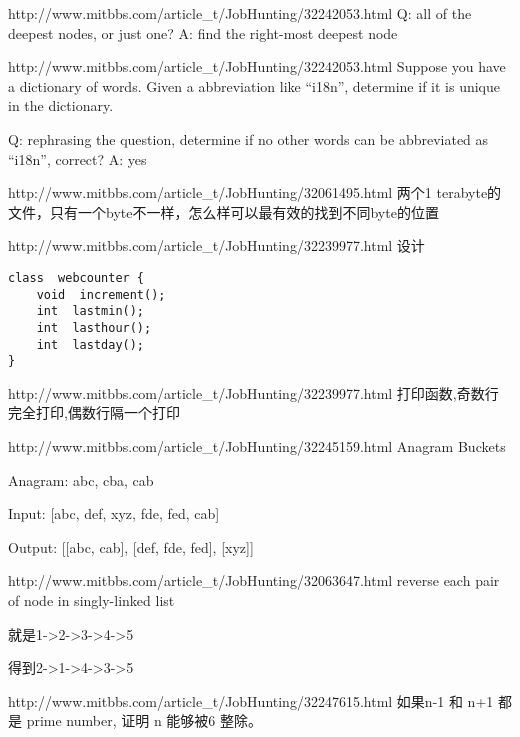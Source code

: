 \documentclass[a4paper]{article}
\begin{document}
\begin{CJK}{UTF8}{gbsn}
\begin{enumerate}
\begin{Q}[Google]{http://www.mitbbs.com/article_t/JobHunting/32242053.html}
Q: all of the deepest nodes, or just one? A: find the right-most deepest node
\end{Q}

\begin{Q}[Google]{http://www.mitbbs.com/article_t/JobHunting/32242053.html}
Suppose you have a dictionary of words. Given a abbreviation like ``i18n'', determine if it is unique in the dictionary.

Q: rephrasing the question, determine if no other words can be abbreviated as ``i18n'', correct? A: yes
\end{Q}

\begin{Q}[Amazon]{http://www.mitbbs.com/article_t/JobHunting/32061495.html}
两个1 terabyte的文件，只有一个byte不一样，怎么样可以最有效的找到不同byte的位置
\end{Q}

\begin{Q}[Google]{http://www.mitbbs.com/article_t/JobHunting/32239977.html}
设计

\begin{lstlisting}
class  webcounter {
	void  increment();
	int  lastmin();
	int  lasthour();
	int  lastday();
}
\end{lstlisting}
\end{Q}

\begin{Q}[Google]{http://www.mitbbs.com/article_t/JobHunting/32239977.html}
打印函数,奇数行完全打印,偶数行隔一个打印
\end{Q}

\begin{Q}[Facebook]{http://www.mitbbs.com/article_t/JobHunting/32245159.html}
Anagram Buckets

Anagram: abc, cba, cab

Input: [abc, def, xyz, fde, fed, cab]

Output: [[abc, cab], [def, fde, fed], [xyz]]
\end{Q}

\begin{Q}[Microsoft]{http://www.mitbbs.com/article_t/JobHunting/32063647.html}
reverse each pair of node in singly-linked list

就是1->2->3->4->5

得到2->1->4->3->5
\end{Q}

\begin{Q}[IXL]{http://www.mitbbs.com/article_t/JobHunting/32247615.html}
如果n-1 和 n+1 都是 prime number, 证明 n 能够被6 整除。
\end{Q}


\end{enumerate}
\end{CJK}
\end{document}
